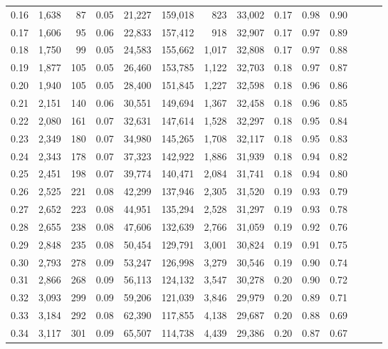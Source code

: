 \begin{tabular}{rrrrrrrrrrrrrr}
0.16 &  1,638 &     87 &  0.05 &   21,227 &  159,018 &     823 &  33,002 &  0.17 &  0.98 &      0.90 \\
0.17 &  1,606 &     95 &  0.06 &   22,833 &  157,412 &     918 &  32,907 &  0.17 &  0.97 &      0.89 \\
0.18 &  1,750 &     99 &  0.05 &   24,583 &  155,662 &   1,017 &  32,808 &  0.17 &  0.97 &      0.88 \\
0.19 &  1,877 &    105 &  0.05 &   26,460 &  153,785 &   1,122 &  32,703 &  0.18 &  0.97 &      0.87 \\
0.20 &  1,940 &    105 &  0.05 &   28,400 &  151,845 &   1,227 &  32,598 &  0.18 &  0.96 &      0.86 \\
0.21 &  2,151 &    140 &  0.06 &   30,551 &  149,694 &   1,367 &  32,458 &  0.18 &  0.96 &      0.85 \\
0.22 &  2,080 &    161 &  0.07 &   32,631 &  147,614 &   1,528 &  32,297 &  0.18 &  0.95 &      0.84 \\
0.23 &  2,349 &    180 &  0.07 &   34,980 &  145,265 &   1,708 &  32,117 &  0.18 &  0.95 &      0.83 \\
0.24 &  2,343 &    178 &  0.07 &   37,323 &  142,922 &   1,886 &  31,939 &  0.18 &  0.94 &      0.82 \\
0.25 &  2,451 &    198 &  0.07 &   39,774 &  140,471 &   2,084 &  31,741 &  0.18 &  0.94 &      0.80 \\
0.26 &  2,525 &    221 &  0.08 &   42,299 &  137,946 &   2,305 &  31,520 &  0.19 &  0.93 &      0.79 \\
0.27 &  2,652 &    223 &  0.08 &   44,951 &  135,294 &   2,528 &  31,297 &  0.19 &  0.93 &      0.78 \\
0.28 &  2,655 &    238 &  0.08 &   47,606 &  132,639 &   2,766 &  31,059 &  0.19 &  0.92 &      0.76 \\
0.29 &  2,848 &    235 &  0.08 &   50,454 &  129,791 &   3,001 &  30,824 &  0.19 &  0.91 &      0.75 \\
0.30 &  2,793 &    278 &  0.09 &   53,247 &  126,998 &   3,279 &  30,546 &  0.19 &  0.90 &      0.74 \\
0.31 &  2,866 &    268 &  0.09 &   56,113 &  124,132 &   3,547 &  30,278 &  0.20 &  0.90 &      0.72 \\
0.32 &  3,093 &    299 &  0.09 &   59,206 &  121,039 &   3,846 &  29,979 &  0.20 &  0.89 &      0.71 \\
0.33 &  3,184 &    292 &  0.08 &   62,390 &  117,855 &   4,138 &  29,687 &  0.20 &  0.88 &      0.69 \\
0.34 &  3,117 &    301 &  0.09 &   65,507 &  114,738 &   4,439 &  29,386 &  0.20 &  0.87 &      0.67 \\

\end{tabular}
